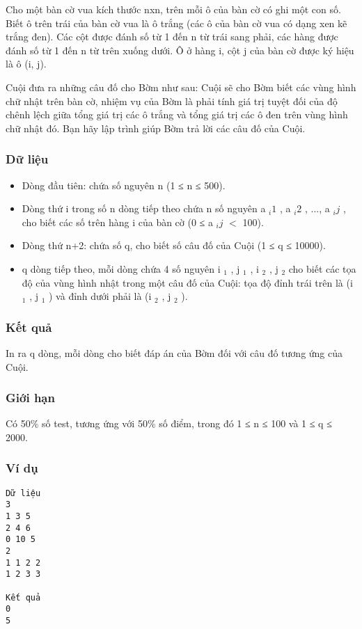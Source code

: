 

Cho một bàn cờ vua kích thước nxn, trên mỗi ô của bàn cờ có ghi một con số. Biết ô trên trái của bàn cờ vua là ô trắng (các ô của bàn cờ vua có dạng xen kẽ trắng đen). Các cột được đánh số từ 1 đến n từ trái sang phải, các hàng được đánh số từ 1 đến n từ trên xuống dưới. Ô ở hàng i, cột j của bàn cờ được ký hiệu là ô (i, j).

Cuội đưa ra những câu đố cho Bờm như sau: Cuội sẽ cho Bờm biết các vùng hình chữ nhật trên bàn cờ, nhiệm vụ của Bờm là phải tính giá trị tuyệt đối của độ chênh lệch giữa tổng giá trị các ô trắng và tổng giá trị các ô đen trên vùng hình chữ nhật đó. Bạn hãy lập trình giúp Bờm trả lời các câu đố của Cuội.

\subsubsection{Dữ liệu}
\begin{itemize}
	\item Dòng đầu tiên: chứa số nguyên n (1 ≤ n ≤ 500).
	\item Dòng thứ i trong số n dòng tiếp theo chứa n số nguyên a $_ i1 $ , a $_ i2 $ , ..., a $_ ij $ , cho biết các số trên hàng i của bàn cờ (0 ≤ a $_ ij $ $<$ 100).
	\item Dòng thứ n+2: chứa số q, cho biết số câu đố của Cuội (1 ≤ q ≤ 10000).
	\item q dòng tiếp theo, mỗi dòng chứa 4 số nguyên i $_ 1 $ , j $_ 1 $ , i $_ 2 $ , j $_ 2 $ cho biết các tọa độ của vùng hình nhật trong một câu đố của Cuội: tọa độ đỉnh trái trên là (i $_ 1 $ , j $_ 1 $ ) và đỉnh dưới phải là (i $_ 2 $ , j $_ 2 $ ).
\end{itemize}

\subsubsection{Kết quả}

In ra q dòng, mỗi dòng cho biết đáp án của Bờm đối với câu đố tương ứng của Cuội.

\subsubsection{Giới hạn}

Có 50\% số test, tương ứng với 50\% số điểm, trong đó 1 ≤ n ≤ 100 và 1 ≤ q ≤ 2000.

\subsubsection{Ví dụ}
\begin{verbatim}
Dữ liệu
3 
1 3 5
2 4 6
0 10 5
2
1 1 2 2
1 2 3 3

Kết quả
0
5
\end{verbatim}